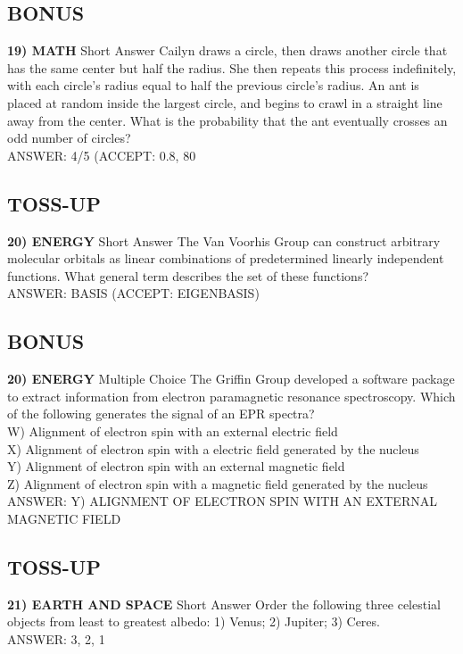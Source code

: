 \documentclass{article}
\begin{document}
\subsection*{BONUS}
\textbf{19) MATH} Short Answer Cailyn draws a circle, then draws another circle that has the same center but half the radius. She then repeats this process indefinitely, with each circle's radius equal to half the previous circle's radius. An ant is placed at random inside the largest circle, and begins to crawl in a straight line away from the center. What is the probability that the ant eventually crosses an odd number of circles?
\\ANSWER: 4/5 (ACCEPT: 0.8, 80%

\subsection*{TOSS-UP}
\textbf{20) ENERGY} Short Answer The Van Voorhis Group can construct arbitrary molecular orbitals as linear combinations of predetermined linearly independent functions. What general term describes the set of these functions?
\\ANSWER: BASIS (ACCEPT: EIGENBASIS)

\subsection*{BONUS}
\textbf{20) ENERGY} Multiple Choice The Griffin Group developed a software package to extract information from electron paramagnetic resonance spectroscopy. Which of the following generates the signal of an EPR spectra?
\\W) Alignment of electron spin with an external electric field
\\X) Alignment of electron spin with a electric field generated by the nucleus
\\Y) Alignment of electron spin with an external magnetic field
\\Z) Alignment of electron spin with a magnetic field generated by the nucleus
\\ANSWER: Y) ALIGNMENT OF ELECTRON SPIN WITH AN EXTERNAL MAGNETIC FIELD

\subsection*{TOSS-UP}
\textbf{21) EARTH AND SPACE} Short Answer Order the following three celestial objects from least to greatest albedo: 1) Venus; 2) Jupiter; 3) Ceres.
\\ANSWER: 3, 2, 1
\end{document}
